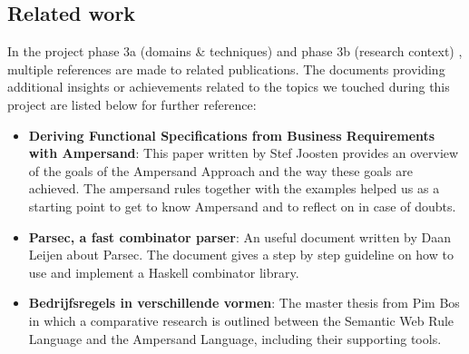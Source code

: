 
\subsection{Related work}
In the project phase 3a (domains \& techniques)  and phase 3b (research context) , multiple references are made to related publications.
The documents providing additional insights or achievements related to the topics we touched during this project are listed below for further reference:

\begin{itemize}
  \item \textbf{Deriving Functional Specifications from Business Requirements with Ampersand}:
    This paper  written by Stef Joosten provides an overview of the goals of the Ampersand Approach and the way these goals are achieved. 
    The ampersand rules together with the examples helped us as a starting point to get to know Ampersand and to  reflect on in case of doubts.
  \item \textbf{Parsec, a fast combinator parser}:
    An useful document  written by Daan Leijen about Parsec.
    The document gives a step by step guideline on how to use and implement a Haskell combinator library.
  \item \textbf{Bedrijfsregels in verschillende vormen}:
    The master thesis  from Pim Bos in which a comparative research is outlined between the Semantic Web Rule Language and the Ampersand Language, including their supporting tools.
\end{itemize}
